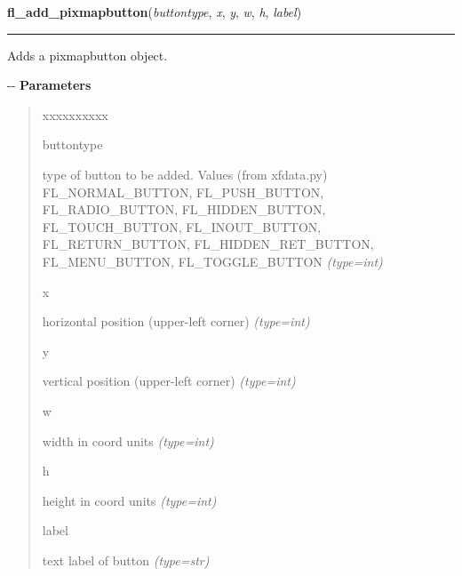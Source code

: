     \vspace{0.5ex}

\hspace{.8\funcindent}\begin{boxedminipage}{\funcwidth}

    \raggedright \textbf{fl\_add\_pixmapbutton}(\textit{buttontype}, \textit{x}, \textit{y}, \textit{w}, \textit{h}, \textit{label})

    \vspace{-1.5ex}

    \rule{\textwidth}{0.5\fboxrule}
\setlength{\parskip}{2ex}

Adds a pixmapbutton object.

-{}-
\setlength{\parskip}{1ex}
      \textbf{Parameters}
      \vspace{-1ex}

      \begin{quote}
        \begin{Ventry}{xxxxxxxxxx}

          \item[buttontype]


type of button to be added. Values (from xfdata.py) FL\_NORMAL\_BUTTON,
FL\_PUSH\_BUTTON, FL\_RADIO\_BUTTON, FL\_HIDDEN\_BUTTON, FL\_TOUCH\_BUTTON,
FL\_INOUT\_BUTTON, FL\_RETURN\_BUTTON, FL\_HIDDEN\_RET\_BUTTON,
FL\_MENU\_BUTTON, FL\_TOGGLE\_BUTTON
            {\it (type=int)}

          \item[x]


horizontal position (upper-left corner)
            {\it (type=int)}

          \item[y]


vertical position (upper-left corner)
            {\it (type=int)}

          \item[w]


width in coord units
            {\it (type=int)}

          \item[h]


height in coord units
            {\it (type=int)}

          \item[label]


text label of button
            {\it (type=str)}

        \end{Ventry}

      \end{quote}


\end{boxedminipage}
